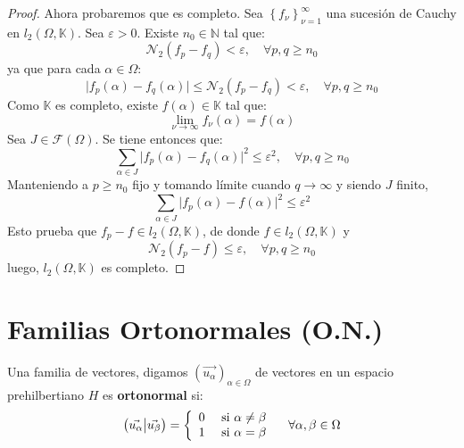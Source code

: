 \documentclass[12pt]{report}
\newcounter{it}
\theoremstyle{largebreak}
\newcommand\abs[1]{\ensuremath{\big|#1\big|}}
\newcommand\pint[2]{\ensuremath{\left(#1\big| #2\right)}}
\begin{document}
\begin{proof}
        Ahora probaremos que es completo. Sea $\left\{f_\nu \right\}_{\nu=1}^\infty$ una sucesión de Cauchy en $l_2(\Omega,\mathbb{K})$. Sea $\varepsilon>0$. Existe $n_0\in\mathbb{N}$ tal que:
        \begin{equation*}
            \mathcal{N}_2(f_p-f_q)<\varepsilon,\quad\forall p,q\geq n_0
        \end{equation*}
        ya que para cada $\alpha\in\Omega$:
        \begin{equation*}
            \abs{f_p(\alpha)-f_q(\alpha)}\leq\mathcal{N}_2(f_p-f_q)<\varepsilon ,\quad\forall p,q\geq n_0
        \end{equation*}
        Como $\mathbb{K}$ es completo, existe $f(\alpha)\in\mathbb{K}$ tal que:
        \begin{equation*}
            \lim_{\nu\rightarrow\infty}f_\nu(\alpha)=f(\alpha)
        \end{equation*}
        Sea $J\in\mathcal{F}(\Omega)$. Se tiene entonces que:
        \begin{equation*}
            \sum_{\alpha\in J}\abs{f_p(\alpha)-f_q(\alpha)}^2\leq\varepsilon^2,\quad\forall p,q\geq n_0
        \end{equation*}
        Manteniendo a $p\geq n_0$ fijo y tomando límite cuando $q\rightarrow\infty$ y siendo $J$ finito,
        \begin{equation*}
            \sum_{\alpha\in J}\abs{f_p(\alpha)-f(\alpha)}^2\leq\varepsilon^2
        \end{equation*}
        Esto prueba que $f_p-f\in l_2(\Omega,\mathbb{K})$, de donde $f\in l_2(\Omega,\mathbb{K})$ y
        \begin{equation*}
            \mathcal{N}_2(f_p-f)\leq \varepsilon,\quad\forall p,q\geq n_0
        \end{equation*}
        luego, $l_2(\Omega,\mathbb{K})$ es completo.
    \end{proof}

    \section{Familias Ortonormales (O.N.)}

    \begin{mydef}
        Una familia de vectores, digamos $\left(\vec{u_\alpha} \right)_{\alpha\in\Omega}$ de vectores en un espacio prehilbertiano $H$ es \textbf{ortonormal} si:
        \begin{equation*}
                \pint{\vec{u_\alpha}}{\vec{u_\beta}}
                =\left\{\begin{array}{lcr}
                    0 & \textup{ si } \alpha\neq\beta\\
                    1 & \textup{ si } \alpha=\beta\\
                \end{array}
                \right.\quad\forall\alpha,\beta\in\Omega
        \end{equation*}
    \end{mydef}
    
\end{document}
